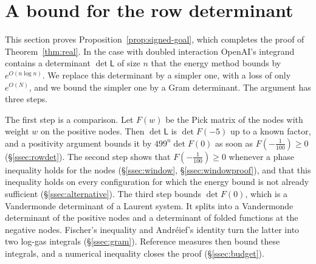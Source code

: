 \documentclass[11pt]{amsart}
\theoremstyle{definition}
\theoremstyle{remark}
\numberwithin{equation}{section}
\begin{document}
\section{A bound for the row determinant}\label{sec:signed}

This section proves Proposition~\ref{prop:signed-goal}, which completes the proof of Theorem~\ref{thm:real}.
In the case with doubled interaction OpenAI's integrand contains a determinant $\det\mathsf L$ of size $n$
that the energy method bounds by $e^{O(n\log n)}$. We replace this determinant by a simpler one, with a loss of only
$e^{O(N)}$, and we bound the simpler one by a Gram determinant. The argument has three steps.

The first step is a comparison. Let $F(w)$ be the Pick matrix of the nodes with weight $w$ on the positive
nodes. Then $\det\mathsf L$ is $\det F(-5)$ up to a known factor, and a positivity argument bounds it by
$499^n\det F(0)$ as soon as $F(-\frac1{100})\ge0$ (\S\ref{ssec:rowdet}). The second step shows that
$F(-\frac1{100})\ge0$ whenever a phase inequality holds for the nodes (\S\ref{ssec:window},
\S\ref{ssec:windowproof}), and that this inequality holds on every configuration for which the energy bound
is not already sufficient (\S\ref{ssec:alternative}). The third step bounds $\det F(0)$, which is a Vandermonde
determinant of a Laurent system. It splits into a Vandermonde determinant of the positive nodes and a
determinant of folded functions at the negative nodes. Fischer's inequality and Andr\'eief's identity turn
the latter into two log-gas integrals (\S\ref{ssec:gram}). Reference measures then bound these integrals,
and a numerical inequality closes the proof (\S\ref{ssec:budget}).
\end{document}
